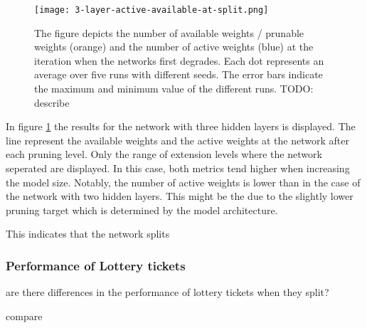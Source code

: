 \begin{figure}[ht]
    \centering
    \texttt{[image: 3-layer-active-available-at-split.png]}
    \caption{
        The figure depicts the number of available weights / prunable weights (orange) and the number of active weights (blue) at the iteration when the networks first degrades.
        Each dot represents an average over five runs with different seeds.
        The error bars indicate the maximum and minimum value of the different runs.
        TODO: describe 
    }
    \label{fig:active-split-3layer}
\end{figure}

In figure \ref{fig:active-split-3layer} the results for the network with three hidden layers is displayed. 
The line represent the available weights and the active weights at the network after each pruning level.
Only the range of extension levels where the network seperated are displayed.
In this case, both metrics tend higher when increasing the model size.
Notably, the number of active weights is lower than in the case of the network with two hidden layers.
This might be the due to the slightly lower pruning target which is determined by the model architecture.


This indicates that the network splits 


\subsubsection{Performance of Lottery tickets}
are there differences in the performance of lottery tickets when they split?

compare 